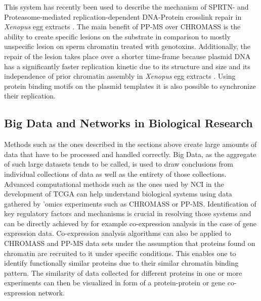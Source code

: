 This system has recently been used to describe the mechanism of SPRTN- and Proteasome-mediated replication-dependent DNA-Protein crosslink repair in \textit{Xenopus} egg extracts \citep{Larsen.2019}. The main benefit of PP-MS over CHROMASS is the ability to create specific lesions on the substrate in comparison to mostly unspecific lesion on sperm chromatin treated with genotoxins. Additionally, the repair of the lesion takes place over a shorter time-frame because plasmid DNA has a significantly faster replication kinetic due to its structure and size and its independence of prior chromatin assembly in \textit{Xenopus} egg extracts \citep{Sanchez.1992, AquilesSanchez.1995}. Using protein binding motifs on the plasmid templates it is also possible to synchronize their replication.\\

\subsection{Big Data and Networks in Biological Research}
Methods such as the ones described in the sections above create large amounts of data that have to be processed and handled correctly. Big Data, as the aggregate of such large datasets tends to be called, is used to draw conclusions from individual collections of data as well as the entirety of those collections.\\
Advanced computational methods such as the ones used by NCI in the development of TCGA can help understand biological systems using data gathered by 'omics experiments such as CHROMASS or PP-MS. Identification of key regulatory factors and mechanisms is crucial in resolving those systems and can be directly achieved by for example co-expression analysis in the case of gene expression data. Co-expression analysis algorithms can also be applied to  CHROMASS and PP-MS data sets under the assumption that proteins found on chromatin are recruited to it under specific conditions. This enables one to identify functionally similar proteins due to their similar chromatin binding pattern. The similarity of data collected for different proteins in one or more experiments can then be visualized in form of a protein-protein or gene co-expression network.
